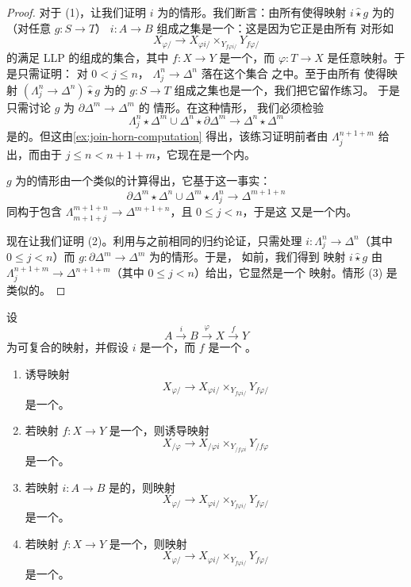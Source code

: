 \begin{proof}
对于 (1)，让我们证明 $i$ 为\trRightAnodyne{}的情形。我们断言：由所有使得映射
$i \hat{\star} g$ 为\trInnerAnodyne{}的（对任意\trMonomorphism{} $g\colon S \to T$）%
\trMonomorphism{} $i\colon A \to B$ 组成之集是一个\trSaturatedClass{}：这是因为它正是由所有
对形如
\[
X_{\varphi/} \to X_{\varphi i/} \times_{Y_{f \varphi i/}} Y_{f \varphi/}
\]
的\trMorphism{}满足 LLP 的\trMonomorphism{}组成的集合，其中 $f\colon X \to Y$
是一个\trInnerFibration{}，而 $\varphi\colon T \to X$ 是任意映射。于是只需证明：
对 $0 < j \le n$，\trHornInclusion{} $\Lambda^n_j \to \Delta^n$ 落在这个集合
之中。至于由所有
使得映射 $(\Lambda^n_j \to \Delta^n) \hat{\star} g$ 为\trInnerAnodyne{}的%
\trMonomorphism{} $g\colon S \to T$ 组成之集也是一个\trSaturatedSet{}，我们把它留作练习。
于是只需讨论 $g$ 为\trBoundaryInclusion{} $\partial \Delta^m \to \Delta^m$ 的
情形。在这种情形，
我们必须检验
\[
\Lambda^n_j \star \Delta^m \cup \Delta^n \star \partial \Delta^m
\to \Delta^n \star \Delta^m
\]
是\trInnerAnodyne{}的。但这由\cref{ex:join-horn-computation} 得出，该练习证明前者由 $\Lambda^{n+1+m}_j$
给出，而由于 $j \le n < n + 1 + m$，它现在是一个内\trHorn{}。

$g$ 为\trLeftAnodyne{}的情形由一个类似的计算得出，它基于这一事实：
\[
\partial \Delta^m \star \Delta^n \cup \Delta^m \star \Lambda^n_j
\to \Delta^{m+1+n}
\]
同构于包含 $\Lambda^{m+1+n}_{m+1+j} \to \Delta^{m+1+n}$，且 $0 \le j < n$，于是这
又是一个内\trHorn{}。

现在让我们证明 (2)。利用与之前相同的归约论证，只需处理
$i\colon \Lambda^n_j \to \Delta^n$（其中 $0 \le j < n$）而
$g\colon \partial \Delta^m \to \Delta^m$ 为\trBoundaryInclusion{}的情形。于是，
如前，我们得到
映射 $i \hat{\star} g$ 由 $\Lambda^{n+1+m}_j \to \Delta^{n+1+m}$（其中
$0 \le j < n$）给出，它显然是一个%
\trLeftAnodyne{}映射。情形 (3) 是类似的。
\end{proof}

\begin{theorem}\label{thm:slice-fibration}
设
\[
A \xrightarrow{\ i\ } B \xrightarrow{\ \varphi\ } X
\xrightarrow{\ f\ } Y
\]
为可复合的映射，并假设 $i$ 是一个\trMonomorphism{}，而 $f$ 是一个%
\trInnerFibration{}。
\begin{enumerate}[label=(\arabic*)]
  \item 诱导映射
\[
X_{\varphi/} \to X_{\varphi i/} \times_{Y_{f \varphi i/}} Y_{f \varphi/}
\]
是一个\trLeftFibration{}。
  \item 若映射 $f\colon X \to Y$ 是一个\trLeftFibration{}，则诱导映射
\[
X_{/\varphi} \to X_{/\varphi i} \times_{Y_{/f \varphi i}} Y_{/f \varphi}
\]
是一个\trLeftFibration{}。
  \item 若映射 $i\colon A \to B$ 是\trRightAnodyne{}的，则映射
\[
X_{\varphi/} \to X_{\varphi i/} \times_{Y_{f \varphi i/}} Y_{f \varphi/}
\]
是一个\trTrivialFibration{}。
  \item 若映射 $f\colon X \to Y$ 是一个\trTrivialFibration{}，则映射
\[
X_{\varphi/} \to X_{\varphi i/} \times_{Y_{f \varphi i/}} Y_{f \varphi/}
\]
是一个\trTrivialFibration{}。
\end{enumerate}
\end{theorem}

